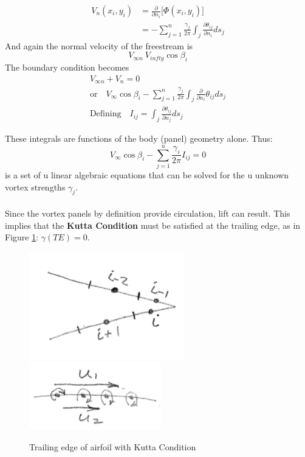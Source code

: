 \documentclass[draft=false, titlepage]{article}
\newcommand{\partialfrac}[2]{\frac{\partial #1}{\partial #2}}
\begin{document}
\begin{align*}
    V_n (x_i, y_i) &= \partialfrac{}{n_i} \Big[ \Phi(x_i, y_i) \Big]\\
    &= -\sum_{j=1}^n \frac{\gamma_j}{2\pi} \int_j \partialfrac{\theta_{ij}}{n_i} ds_j
\end{align*}
And again the normal velocity of the freestream is
\begin{equation*}
    V_{\infty n} \ V_{infty} \cos\beta_i
\end{equation*}
The boundary condition becomes
\begin{gather*}
    V_{\infty n} + V_n = 0\\
    \text{or} \quad V_\infty \cos\beta_i - \sum_{j=1}^n \frac{\gamma_j}{2\pi} \int_j \partialfrac{}{n_i} \theta_{ij} ds_j\\
    \text{Defining} \quad I_{ij} = \int_j \partialfrac{\theta_{ij}}{n_j}ds_j
\end{gather*}

These integrals are functions of the body (panel) geometry alone. Thus:
\begin{equation*}
    V_\infty \cos\beta_i - \sum_{j=1}^u \frac{\gamma_i}{2\pi} I_{ij} = 0
\end{equation*}
is a set of u linear algebraic equations that can be solved for the u unknown vortex strengths $\gamma_j$.
\paragraph*{} Since the vortex panels by definition provide circulation, lift can result. This implies that the \textbf{Kutta Condition} must be satisfied at the trailing edge, as in Figure \ref{fig:vortexPanelTrailingEdge}: $\gamma(TE) = 0$.

\begin{figure}[ht]
    \centering
    \includegraphics[width=0.3\linewidth]{Figures/vortexPanelTrailingEdge.PNG}
    \includegraphics[width=0.3\linewidth]{Figures/vortexPanelTiny.PNG}
    \caption{Trailing edge of airfoil with Kutta Condition}
    \label{fig:vortexPanelTrailingEdge}
\end{figure}
\end{document}
